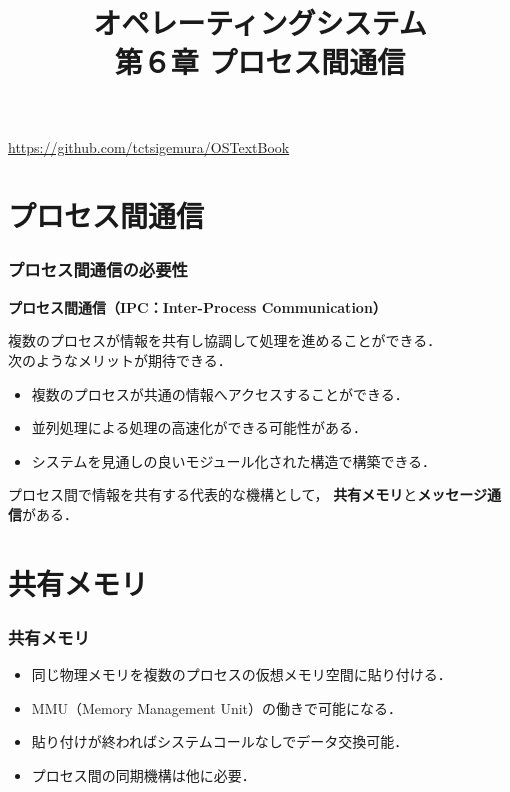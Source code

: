 \documentclass[unicode,handout]{beamer}                   %
\begin{document}
\title[プロセス間通信]
      {オペレーティングシステム\\第６章 プロセス間通信}
\date{}
\begin{frame}
  \titlepage
  \centerline{\url{https://github.com/tctsigemura/OSTextBook}}
\end{frame}


\section{プロセス間通信}
\begin{frame}
  \frametitle{プロセス間通信の必要性}

{\bf プロセス間通信（IPC：Inter-Process Communication）}

複数のプロセスが情報を共有し協調して処理を進めることができる．\\
次のようなメリットが期待できる．

\begin{itemize}
\item 複数のプロセスが共通の情報へアクセスすることができる．
\item 並列処理による処理の高速化ができる可能性がある．
\item システムを見通しの良いモジュール化された構造で構築できる．
\end{itemize}

プロセス間で情報を共有する代表的な機構として，
{\bf 共有メモリ}と{\bf メッセージ通信}がある．
\end{frame}

\section{共有メモリ}
\begin{frame}
  \frametitle{共有メモリ}
  \begin{itemize}
  \item 同じ物理メモリを複数のプロセスの仮想メモリ空間に貼り付ける．
  \item MMU（Memory Management Unit）の働きで可能になる．
  \item 貼り付けが終わればシステムコールなしでデータ交換可能．
  \item プロセス間の同期機構は他に必要．
  \end{itemize}
\end{frame}
\end{document}
